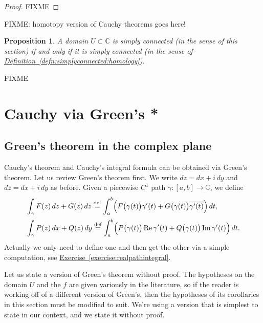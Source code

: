 \documentclass[12pt,openany]{book}
\renewcommand{\Re}{\operatorname{Re}}
\renewcommand{\Im}{\operatorname{Im}}
\newcommand{\C}{{\mathbb{C}}}
\theoremstyle{plain}
\newtheorem{prop}[thm]{Proposition}
\theoremstyle{remark}
\theoremstyle{definition}
\theoremstyle{exercise}
\theoremstyle{example}
\newcommand{\exerciseref}[1]{\hyperref[#1]{Exercise~\ref*{#1}}}
\newcommand{\defnref}[1]{\hyperref[#1]{Definition~\ref*{#1}}}
\begin{document}
\begin{proof}
FIXME
\end{proof}

FIXME: homotopy version of Cauchy theorems goes here!

\begin{prop}
A domain $U \subset \C$ is simply connected (in the sense of this section)
if and only if it is simply connected
(in the sense of \defnref{defn:simplyconnected:homology}).
\end{prop}

FIXME


\section{Cauchy via Green's *}

\subsection{Green's theorem in the complex plane}

Cauchy's theorem and Cauchy's integral formula can be obtained via 
Green's theorem.
Let us review Green's theorem first.
We write $dz = dx + i\, dy$ and $d\bar{z} = dx + i \, dy$ as before.
Given a piecewise $C^1$ path $\gamma \colon [a,b] \to \C$, we define
\begin{align*}
& \int_\gamma
F(z) \, dz + G(z) \, d\bar{z}
\overset{\text{def}}{=}
\int_a^b 
\Bigl(F\bigl(\gamma(t)\bigr) \gamma'(t) + G\bigl(\gamma(t)\bigr)
\overline{\gamma'(t)} \Bigr) \, dt ,
\\
& \int_\gamma
P(z) \, dx + Q(z) \, dy
\overset{\text{def}}{=}
\int_a^b 
\Bigl(P\bigl(\gamma(t)\bigr) \Re \gamma'(t) + Q\bigl(\gamma(t)\bigr) \Im
\gamma'(t) \Bigr) \, dt .
\end{align*}
Actually we only need to define one and then get the other via a simple
computation, see \exerciseref{exercise:realpathintegral}.

Let us state a version of Green's theorem without proof.
The hypotheses on the domain $U$ and the $f$ are given variously in the literature,
so if the reader is working off of a different version of Green's, then the
hypotheses of its corollaries in this section must be modified to suit.
We're using a version that is simplest to state in our context, and we
state it without proof.
\end{document}
